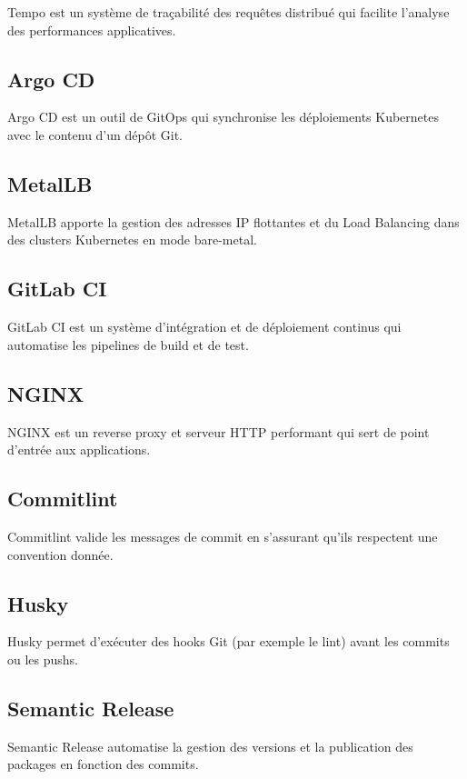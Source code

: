 Tempo est un système de traçabilité des requêtes distribué qui facilite l’analyse des performances applicatives.

\subsection{Argo CD}

Argo CD est un outil de GitOps qui synchronise les déploiements Kubernetes avec le contenu d’un dépôt Git.

\subsection{MetalLB}

MetalLB apporte la gestion des adresses IP flottantes et du Load Balancing dans des clusters Kubernetes en mode bare-metal.

\subsection{GitLab CI}

GitLab CI est un système d’intégration et de déploiement continus qui automatise les pipelines de build et de test.

\subsection{NGINX}

NGINX est un reverse proxy et serveur HTTP performant qui sert de point d’entrée aux applications.

\subsection{Commitlint}

Commitlint valide les messages de commit en s’assurant qu’ils respectent une convention donnée.

\subsection{Husky}

Husky permet d’exécuter des hooks Git (par exemple le lint) avant les commits ou les pushs.

\subsection{Semantic Release}

Semantic Release automatise la gestion des versions et la publication des packages en fonction des commits.


